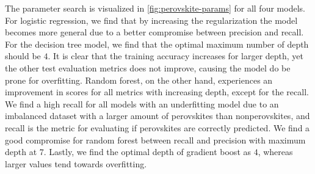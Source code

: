 \begin{table}[!ht]
\centering
\caption{Table with corresponding best estimators during a grid search scheme for predicting perovskites or not. The test score is here referred to as a balanced accuracy score, and we list all standard deviations in paranthesis.}
\label{tab:perovskite-optimal}
\noindent{}
\end{table}

The parameter search is visualized in \autoref{fig:perovskite-params} for all four models. For logistic regression, we find that by increasing the regularization the model becomes more general due to a better compromise between precision and recall. For the decision tree model, we find that the optimal maximum number of depth should be $4$. It is clear that the training accuracy increases for larger depth, yet the other test evaluation metrics does not improve, causing the model do be prone for overfitting. Random forest, on the other hand, experiences an improvement in scores for all metrics with increasing depth, except for the recall. We find a high recall for all models with an underfitting model due to an imbalanced dataset with a larger amount of perovskites than nonperovskites, and recall is the metric for evaluating if perovskites are correctly predicted. We find a good compromise for random forest between recall and precision with maximum depth at $7$. Lastly, we find the optimal depth of gradient boost as $4$, whereas larger values tend towards overfitting.


